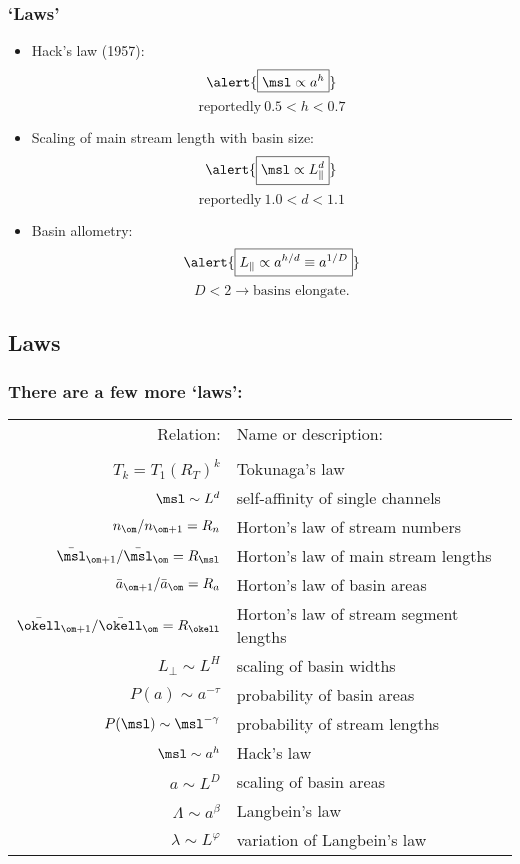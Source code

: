 \begin{frame}[label=]
  \frametitle{`Laws'}

  \begin{itemize}
  \item<1->   Hack's law (1957)\cite{hack1957a}:  
    $$ \alert{\boxed{\msl \propto a^h}}$$
    $$ \mbox{reportedly} \ 0.5 < h < 0.7 $$
  \item<2->   Scaling of main stream length with basin size:
    $$ \alert{\boxed{\msl \propto L_\parallel^d}} $$
    $$ \mbox{reportedly} \ 1.0 < d < 1.1 $$
  \item<3->   Basin allometry:
    $$ \alert{\boxed{L_\parallel \propto a^{h/d} \equiv a^{1/D}}}$$
    $$D < 2 \rightarrow \mbox{basins elongate}.$$
  \end{itemize}

\end{frame}

\subsection{Laws}

\begin{frame}[label=]
  \frametitle{There are a few more `laws':\cite{dodds1999a}}

  \settablerowcolours
  \begin{tabular}{rl}
    \alert{Relation:} & \alert{Name or description:}  \\
    & \\
    $T_{k} = T_1 (R_T)^{k}$ & {Tokunaga's law}  \\
    $\msl \sim L^{{d}}$ & {self-affinity of single channels}  \\
    $n_{\om}/n_{\om+1} = R_n$ & Horton's law of stream numbers  \\
    $\bar{\msl}_{\om+1}/\bar{\msl}_{\om} = R_{\msl}$ & Horton's law 
    of main stream lengths \\
    $\bar{a}_{\om+1}/\bar{a}_{\om} = R_a$ & Horton's law of basin areas \\
    $\bar{\okell}_{\om+1}/\bar{\okell}_{\om} = R_{\okell}$ & Horton's law 
    of stream segment lengths  \\
    $L_\perp \sim L^H$ & scaling of basin widths \\
    $P(a) \sim a^{-\tau}$ & probability of basin areas \\
    $P(\msl)\sim \msl^{-\gamma}$ & probability of stream lengths \\
    $\msl \sim a^h$ & Hack's law \\
    $a \sim L^D$ & scaling of basin areas \\
    $\Lambda \sim a^\beta$ & Langbein's law \\
    $\lambda \sim L^\varphi$ & variation of Langbein's law\\
  \end{tabular}

\end{frame}

